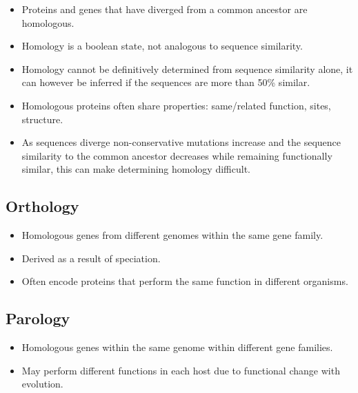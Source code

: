 \documentclass[a4paper]{article}
\begin{document}
\begin{itemize}
  \item
    Proteins and genes that have diverged from a common ancestor are homologous.

  \item
    Homology is a boolean state, not analogous to sequence similarity.

  \item
    Homology cannot be definitively determined from sequence similarity alone,
    it can however be inferred if the sequences are more than 50\% similar.

  \item
    Homologous proteins often share properties: same/related function, sites,
    structure.

  \item
    As sequences diverge non-conservative mutations increase and the sequence
    similarity to the common ancestor decreases while remaining functionally
    similar, this can make determining homology difficult.
\end{itemize}

\subsection{Orthology}

\begin{itemize}
  \item
    Homologous genes from different genomes within the same gene family.

  \item
    Derived as a result of speciation.

  \item
    Often encode proteins that perform the same function in different organisms.
\end{itemize}

\subsection{Parology}

\begin{itemize}
  \item
    Homologous genes within the same genome within different gene families.

  \item
    May perform different functions in each host due to functional change with
    evolution.
\end{itemize}
\end{document}
